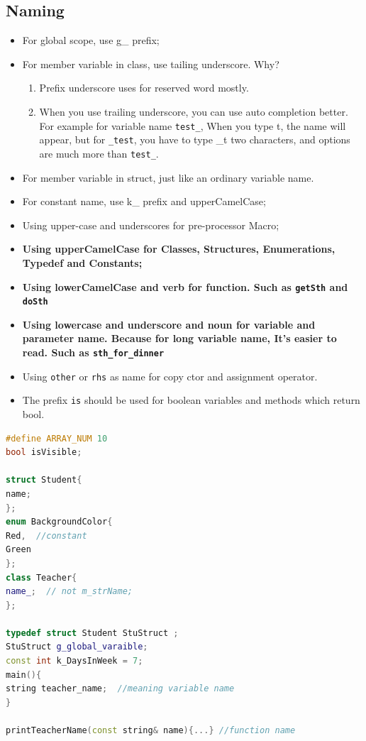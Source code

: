 \documentclass[a4paper,11pt,twoside]{book}
\begin{document}
\subsection{Naming}
\begin{itemize}
	
	\item For global scope, use g\_ prefix;
	
	\item For member variable in class, use tailing underscore. Why? 
	\begin{enumerate}
		\item Prefix underscore uses for reserved word mostly.
		\item When you use trailing underscore, you can use auto completion better. For example for variable name \texttt{test\_}, When you type t, the name will appear, but for \texttt{\_test}, you have to type \_t two characters, and options are much more than \texttt{test\_}.
	\end{enumerate}
	
	\item For member variable in struct, just like an ordinary variable name. 
	
	\item For constant name, use k\_ prefix and upperCamelCase;
	
	\item Using upper-case and underscores for pre-processor Macro;
	
	\item \textbf{Using upperCamelCase for Classes, Structures, Enumerations, Typedef and  Constants;}
	
	\item \textbf{Using lowerCamelCase and verb for function. Such as \texttt{getSth} and \texttt{doSth}}
	
	\item \textbf{Using lowercase and underscore  and noun for variable and parameter name. Because for long variable name, It's easier to read. Such as \texttt{sth\_for\_dinner}}
	
	\item Using \texttt{other} or \texttt{rhs} as name for copy ctor and assignment operator.
	
	\item The prefix \texttt{is} should be used for boolean variables and methods which return bool.
	
\end{itemize}

\begin{lstlisting}[frame=single, language=c++]
#define ARRAY_NUM 10
bool isVisible;

struct Student{
name;
};
enum BackgroundColor{
Red,  //constant
Green
};
class Teacher{
name_;  // not m_strName;  
};

typedef struct Student StuStruct ;
StuStruct g_global_varaible;
const int k_DaysInWeek = 7;
main(){
string teacher_name;  //meaning variable name
}

printTeacherName(const string& name){...} //function name
\end{lstlisting}
\end{document}
